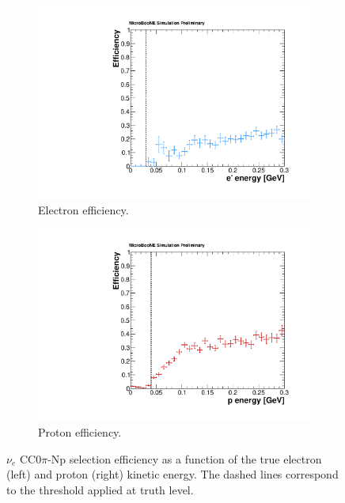 \begin{figure}
\centering
  \begin{subfigure}{0.48\textwidth}
    \includegraphics[width=\linewidth]{figures/e_efficiency.pdf}
    \caption{Electron efficiency.} 
  \end{subfigure}
    \begin{subfigure}{0.48\textwidth}
    \includegraphics[width=\linewidth]{figures/p_efficiency.pdf}
    \caption{Proton efficiency.} 
  \end{subfigure}
  \caption{$\nu_{e}$ CC$0\pi$-Np selection efficiency as a function of the true electron (left) and proton (right) kinetic energy. The dashed lines correspond to the threshold applied at truth level.}
  \label{fig:thresholds}
\end{figure}


